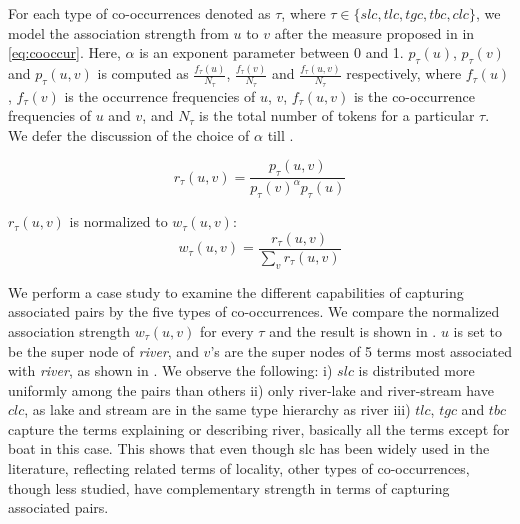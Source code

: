 For each type of co-occurrences denoted as $\tau$, where $\tau\in \{slc,
tlc, tgc, tbc, clc\}$, we model the association strength from $u$ to
$v$ after the measure proposed in \cite{Wettler:1993}
in \eqref{eq:cooccur}. Here, $\alpha$ is an exponent
parameter between 0 and 1. $p_\tau(u)$, $p_\tau(v)$ and $p_\tau(u,v)$ is
computed as $\frac{f_\tau(u)}{N_\tau}$, $\frac{f_\tau(v)}{N_\tau}$ and
$\frac{f_\tau(u,v)}{N_\tau}$ respectively, where $f_\tau(u)$, $f_\tau(v)$ is the
occurrence frequencies of $u$, $v$, $f_\tau(u,v)$ is the co-occurrence
frequencies of $u$ and $v$, and $N_\tau$ is the total number of tokens
for a particular $\tau$. We defer the discussion of the choice of $\alpha$ 
till .

\begin{equation}
r_\tau(u,v) = \frac{p_\tau(u,v)}{p_\tau(v)^\alpha p_\tau(u)}
\label{eq:cooccur}
\end{equation}

$r_\tau(u, v)$ is normalized to $w_\tau(u, v)$:
\begin{equation}
w_\tau(u, v) = \frac {r_\tau(u,v)} {\sum_{v}r_\tau(u,v)}
\label{eq:normalize2}
\end{equation}

We perform a case study to examine the different capabilities of
capturing associated pairs by the five types of co-occurrences.
We compare the normalized association strength $w_\tau(u, v)$ for 
every $\tau$ and the result is shown in . 
$u$ is set to be the super node of {\em river}, 
and $v$'s are the super nodes of 5 terms most associated with {\em river},
as shown in .
We observe the following:
i) $slc$ is distributed more uniformly
among the pairs than others ii) only river-lake and river-stream
have $clc$, as lake and stream are in the same type hierarchy as
river iii) $tlc$, $tgc$ and $tbc$ capture the terms explaining or
describing river, basically all the terms except for boat in this
case. This shows that even though slc has been widely used in 
the literature, reflecting related terms of locality, 
other types of co-occurrences, though less studied, 
have complementary strength in terms of capturing associated pairs.


